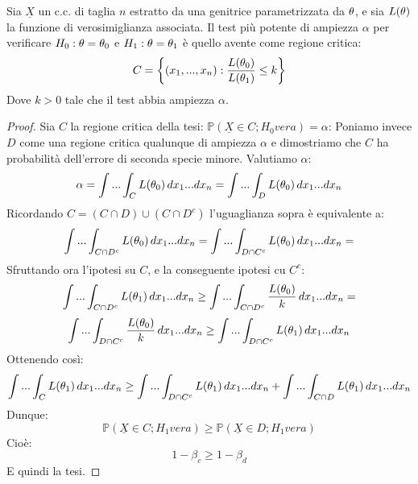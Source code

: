 \begin{theorem}
Sia $\underline{X}$ un c.c. di taglia $n$ estratto da una genitrice parametrizzata da $\theta$, e sia $L(\theta)$ la funzione di verosimiglianza associata. Il test più potente di ampiezza $\alpha$ per verificare $H_0 : \theta=\theta_0$ e $H_1 : \theta=\theta_1$ è quello avente come regione critica: \[C=\bigg\{(x_1,...,x_n) : \frac{L(\theta_0)}{L(\theta_1)}\leq k\bigg\}\]
Dove $k>0$ tale che il test abbia ampiezza $\alpha$.
\begin{proof}
Sia $C$ la regione critica della tesi: $\mathbb{P}(\underline{X}\in C ; H_0 vera)=\alpha$:
\newline 
Poniamo invece $D$ come una regione critica qualunque di ampiezza $\alpha$ e dimostriamo che $C$ ha probabilità dell'errore di seconda specie minore. Valutiamo $\alpha$:
\[\alpha=\int...\int_C L(\theta_0) \,dx_1...dx_n = \int...\int_D L(\theta_0) \,dx_1...dx_n  \]
Ricordando $C=(C\cap D)\cup(C\cap D^c)$ l'uguaglianza sopra è equivalente a:
\[\int...\int_{C\cap D^c} L(\theta_0) \,dx_1...dx_n =\int...\int_{D\cap C^c} L(\theta_0) \,dx_1...dx_n =  \]
Sfruttando ora l'ipotesi su $C$, e la conseguente ipotesi cu $C^c$:
\[\int...\int_{C\cap D^c} L(\theta_1) \,dx_1...dx_n \geq \int...\int_{C\cap D^c} \frac{L(\theta_0)}{k} \,dx_1...dx_n = \]
\[\int...\int_{D\cap C^c} \frac{L(\theta_0)}{k} \,dx_1...dx_n \geq \int...\int_{D\cap C^c} L(\theta_1) \,dx_1...dx_n\]
Ottenendo così: \[\int...\int_C L(\theta_1) \,dx_1...dx_n\geq\int...\int_{D\cap C^c} L(\theta_1) \,dx_1...dx_n + \int...\int_{C\cap D} L(\theta_1) \,dx_1...dx_n\]
Dunque: \[\mathbb{P}(\underline{X}\in C ; H_1 vera) \geq \mathbb{P}(\underline{X}\in D ; H_1 vera)\]
Cioè:\[1-\beta_c\geq 1-\beta_d\]
E quindi la tesi.
\end{proof}
\end{theorem}
